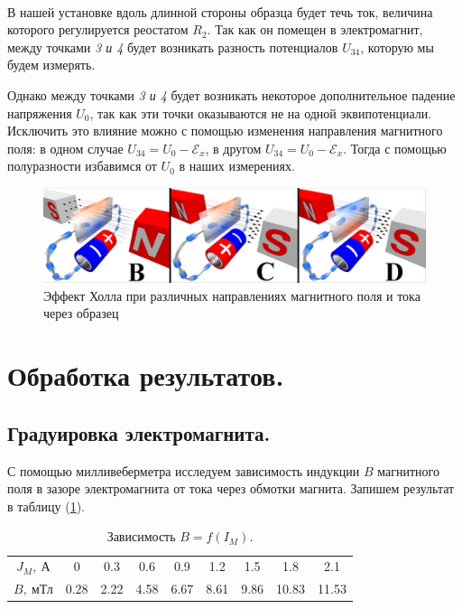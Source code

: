 \documentclass[a4paper, 12pt, twoside]{article}
\begin{document}
 ~

В нашей установке вдоль длинной стороны образца будет течь ток, величина которого регулируется реостатом $R_2$. Так как он помещен в электромагнит, между точками \textit{3 и 4} будет возникать разность потенциалов $U_{34}$, которую мы будем измерять. 

Однако между точками \textit{3 и 4} будет возникать некоторое дополнительное падение напряжения $U_{0}$, так как эти точки оказываются не на одной эквипотенциали. Исключить это влияние можно с помощью изменения направления магнитного поля: в одном случае $U_{34} = U_{0} - \mathcal{E}_x $, в другом  $U_{34} = U_0 - \mathcal{E}_x $. Тогда с помощью полуразности избавимся от $U_{0}$ в наших измерениях. 

\begin{figure}[H]
	\begin{center}
		\includegraphics[width = 0.6 \textwidth]{Hall_dif}
		\caption{Эффект Холла при различных направлениях магнитного поля и тока через образец}
	\end{center}
\end{figure}

\newpage

\section{Обработка результатов.}
\subsection{Градуировка электромагнита.}
С помощью милливеберметра исследуем зависимость индукции $B$ магнитного поля в зазоре электромагнита от тока через обмотки магнита. Запишем результат в таблицу (\ref{t1}).

\begin{table}[H]
	\centering
	\caption{Зависимость $B = f(I_{M})$.}
	\label{t1}
	\begin{tabular}{c|cccccccc} \toprule
		$J_{M},~\text{А}$ & 0    & 0.3  & 0.6  & 0.9  & 1.2  & 1.5  & 1.8   & 2.1   \\
		$B,~\text{мТл}$   & 0.28 & 2.22 & 4.58 & 6.67 & 8.61 & 9.86 & 10.83 & 11.53 \\ \bottomrule
	\end{tabular}
\end{table}
\end{document}
